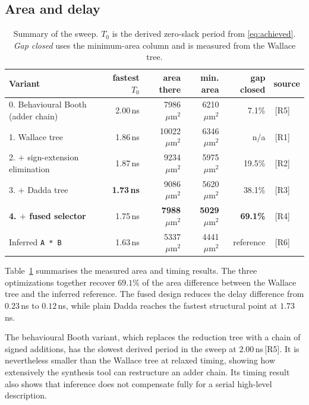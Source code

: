 \documentclass[11pt,a4paper]{article}
\newcommand{\umarea}{\ensuremath{\,\mu\mathrm{m}^{2}}}
\newcommand{\src}[1]{\,{\footnotesize\color{accent}[#1]}}
\begin{document}
\subsection{Area and delay}

\begin{table}[!ht]
\centering\small
\begin{tabular}{@{}lrrrrl@{}}
\toprule
\textbf{Variant} & \textbf{fastest $T_0$} & \textbf{area there} & \textbf{min. area} & \textbf{gap closed} & \textbf{source} \\
\midrule
0. Behavioural Booth (adder chain)   & 2.00\,ns & 7986\umarea & 6210\umarea &  7.1\% & \src{R5} \\
1. Wallace tree                      & 1.86\,ns & 10022\umarea & 6346\umarea & n/a     & \src{R1} \\
2. $+$ sign-extension elimination    & 1.87\,ns & 9234\umarea & 5975\umarea & 19.5\% & \src{R2} \\
3. $+$ Dadda tree                    & \textbf{1.73\,ns} & 9086\umarea & 5620\umarea & 38.1\% & \src{R3} \\
\textbf{4. $+$ fused selector}       & 1.75\,ns & \textbf{7988\umarea} & \textbf{5029\umarea} & \textbf{69.1\%} & \src{R4} \\
\midrule
Inferred \texttt{A * B}              & 1.63\,ns & 5337\umarea & 4441\umarea & reference & \src{R6} \\
\bottomrule
\end{tabular}
\caption{Summary of the sweep. $T_0$ is the derived zero-slack period from
\eqref{eq:achieved}. \emph{Gap closed} uses the minimum-area column and is
measured from the Wallace tree.}
\label{tab:summary}
\end{table}

Table~\ref{tab:summary} summarises the measured area and timing results. The
three optimizations together recover $69.1\%$ of the area difference between the
Wallace tree and the inferred reference. The fused design reduces the
delay difference from $0.23$\,ns to $0.12$\,ns, while plain Dadda reaches the
fastest structural point at $1.73$\,ns.

The behavioural Booth variant, which replaces the reduction tree with a chain of
signed additions, has the slowest derived period in the sweep at
$2.00$\,ns\src{R5}. It is nevertheless smaller than the Wallace tree at
relaxed timing, showing how extensively the synthesis tool can restructure an
adder chain. Its timing result also shows that inference does not compensate
fully for a serial high-level description.
\end{document}
